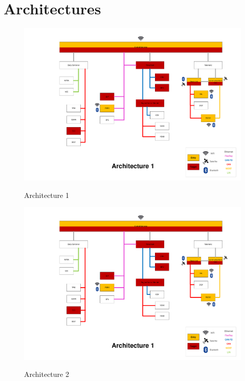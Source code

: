 \chapter{Architectures}

\begin{figure}[h]
    \centering
    \caption{Architecture 1}
    \includegraphics[width=\textwidth, page=1]{../Architectures-survey.pdf}
    \label{fig:architecture1}
\end{figure}

\begin{figure}[h]
    \centering
    \caption{Architecture 2}
    \includegraphics[width=\textwidth, page=2]{../Architectures-survey.pdf}
    \label{fig:architecture2}
\end{figure}

